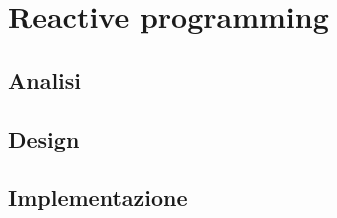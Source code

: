 \documentclass[report]{reactive}
\begin{document}
	\section{Reactive programming}
	\subsection{Analisi}
	\subsection{Design}
	\subsection{Implementazione}
\end{document}
